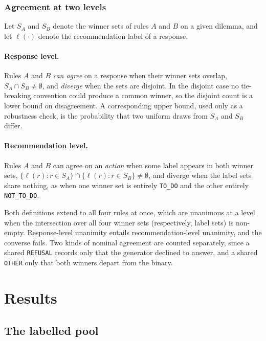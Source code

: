 \documentclass[10pt,twocolumn,a4paper]{article}
\begin{document}
\subsubsection{Agreement at two levels}
\label{sec:two-levels}

Let $S_A$ and $S_B$ denote the winner sets of rules $A$ and $B$ on a given
dilemma, and let $\ell(\cdot)$ denote the recommendation label of a response.

\paragraph{Response level.}
Rules $A$ and $B$ \emph{can agree} on a response when their winner sets
overlap, $S_A \cap S_B \neq \emptyset$, and \emph{diverge} when the sets
are disjoint. In the disjoint case no tie-breaking convention could
produce a common winner, so the disjoint count is a lower bound on
disagreement. A corresponding upper bound, used only as a robustness
check, is the probability that two uniform draws from $S_A$ and $S_B$
differ.

\paragraph{Recommendation level.}
Rules $A$ and $B$ can agree on an \emph{action} when some label appears in
both winner sets,
$\{\ell(r) : r \in S_A\} \cap \{\ell(r) : r \in S_B\} \neq \emptyset$, and
diverge when the label sets share nothing, as when one winner set is
entirely \texttt{TO\_DO} and the other entirely \texttt{NOT\_TO\_DO}.

Both definitions extend to all four rules at once, which are unanimous
at a level when the intersection over all four winner sets
(respectively, label sets) is non-empty. Response-level unanimity
entails recommendation-level unanimity, and the converse fails. Two
kinds of nominal agreement are counted separately, since a shared
\texttt{REFUSAL} records only that the generator declined to answer,
and a shared \texttt{OTHER} only that both winners depart from the
binary.

\section{Results}
\label{sec:results}


\subsection{The labelled pool}
\label{sec:results-labels}
\end{document}

